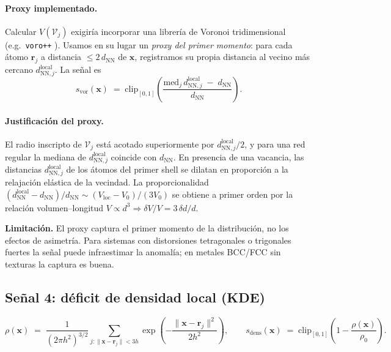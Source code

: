 \documentclass[11pt,a4paper]{article}
\theoremstyle{remark}
\begin{document}
\paragraph{Proxy implementado.} Calcular $V(\mathcal{V}_j)$ exigiría
incorporar una librería de Voronoi tridimensional (e.g.\ \texttt{voro++}
\cite{Rycroft2009}). Usamos en su lugar un \emph{proxy del primer
momento}: para cada átomo $\mathbf{r}_j$ a distancia $\leq 2\,d_\text{NN}$
de $\mathbf{x}$, registramos su propia distancia al vecino más cercano
$d_{\text{NN},j}^\text{local}$. La señal es
\begin{equation}
  s_\text{vor}(\mathbf{x}) \;=\; \mathrm{clip}_{[0,1]}\!\left(
  \frac{\mathrm{med}_j \,d_{\text{NN},j}^\text{local}
        \;-\; d_\text{NN}}{d_\text{NN}} \right).
  \label{eq:sig-vor}
\end{equation}

\paragraph{Justificación del proxy.} El radio inscripto de
$\mathcal{V}_j$ está acotado superiormente por
$d_{\text{NN},j}^\text{local}/2$, y para una red regular la mediana de
$d_{\text{NN},j}^\text{local}$ coincide con $d_\text{NN}$. En presencia
de una vacancia, las distancias $d_{\text{NN},j}^\text{local}$ de los
átomos del primer shell se dilatan en proporción a la relajación
elástica de la vecindad. La proporcionalidad
$(d_\text{NN}^\text{local} - d_\text{NN})/d_\text{NN}
\sim (V_\text{loc} - V_0)/(3 V_0)$ se obtiene a primer orden por la
relación volumen--longitud $V \propto d^3 \Rightarrow \delta V/V =
3\,\delta d/d$.

\textbf{Limitación.} El proxy captura el primer momento de la
distribución, no los efectos de asimetría. Para sistemas con
distorsiones tetragonales o trigonales fuertes la señal puede
infraestimar la anomalía; en metales BCC/FCC sin texturas la captura
es buena.

\subsection{Señal 4: déficit de densidad local (KDE)}
\label{sec:sig-density}

\begin{equation}
  \rho(\mathbf{x}) \;=\;
  \frac{1}{(2\pi h^2)^{3/2}} \sum_{j: \|\mathbf{x}-\mathbf{r}_j\| < 3h}
  \exp\!\left( -\frac{\|\mathbf{x} - \mathbf{r}_j\|^2}{2 h^2} \right),
  \qquad
  s_\text{dens}(\mathbf{x}) \;=\; \mathrm{clip}_{[0,1]}\!\left(
  1 - \frac{\rho(\mathbf{x})}{\rho_0}\right).
  \label{eq:sig-density}
\end{equation}
\end{document}
